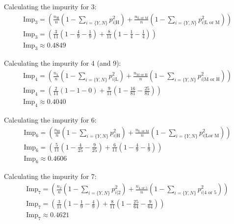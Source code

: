 \documentclass{article}
\begin{document}
\begin{flushleft}
Calculating the impurity for 3:
\begin{gather*}
\text{Imp}_{3} = \left(\frac{n_{\text{H}}}{n} \left(1 - \sum_{i = \{Y, N\}} p_{i | \text{H}}^{2}\right) + \frac{n_{\text{L or M}}}{n} \left(1 - \sum_{i = \{Y, N\}} p_{i | \text{L or M}}^{2}\right)\right) \\
\text{Imp}_{3} = \left(\frac{3}{11} \left(1 - \frac{4}{9} - \frac{1}{9}\right) + \frac{8}{11} \left(1 - \frac{1}{4} - \frac{1}{4}\right)\right) \\
\text{Imp}_{3} \approx \mathbf{0.4849} 
\end{gather*}

Calculating the impurity for 4 (and 9):
\begin{gather*}
\text{Imp}_{4} = \left(\frac{n_{\text{L}}}{n} \left(1 - \sum_{i = \{Y, N\}} p_{i | \text{L}}^{2}\right) + \frac{n_{\text{M or H}}}{n} \left(1 - \sum_{i = \{Y, N\}} p_{i | \text{M or H}}^{2}\right)\right) \\
\text{Imp}_{4} = \left(\frac{2}{11} \left(1 - 1 - 0\right) + \frac{9}{11} \left(1 - \frac{16}{81} - \frac{25}{81}\right)\right) \\
\text{Imp}_{4} \approx \mathbf{0.4040} 
\end{gather*}

Calculating the impurity for 6:
\begin{gather*}
\text{Imp}_{6} = \left(\frac{n_{\text{H}}}{n} \left(1 - \sum_{i = \{Y, N\}} p_{i | \text{H}}^{2}\right) + \frac{n_{\text{L or M}}}{n} \left(1 - \sum_{i = \{Y, N\}} p_{i | \text{Lor M}}^{2}\right)\right) \\
\text{Imp}_{6} = \left(\frac{5}{11} \left(1 - \frac{4}{25} - \frac{9}{25}\right) + \frac{6}{11} \left(1 - \frac{4}{9} - \frac{1}{9}\right)\right) \\
\text{Imp}_{6} \approx \mathbf{0.4606} 
\end{gather*}

Calculating the impurity for 7:
\begin{gather*}
\text{Imp}_{7} = \left(\frac{n_{\text{2}}}{n} \left(1 - \sum_{i = \{Y, N\}} p_{i | \text{2}}^{2}\right) + \frac{n_{\text{4 or 5}}}{n} \left(1 - \sum_{i = \{Y, N\}} p_{i | \text{4 or 5}}^{2}\right)\right) \\
\text{Imp}_{7} = \left(\frac{3}{11} \left(1 - \frac{1}{9} - \frac{4}{9}\right) + \frac{8}{11} \left(1 - \frac{25}{64} - \frac{9}{64}\right)\right) \\
\text{Imp}_{7} \approx \mathbf{0.4621} 
\end{gather*}


\end{flushleft}
\end{document}
